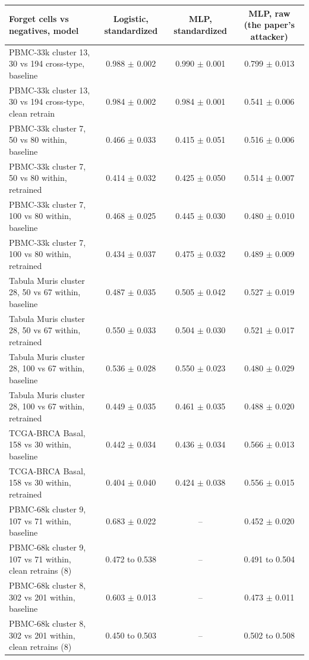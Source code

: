 \begin{tabular}{lccc}
\toprule
Forget cells vs negatives, model & Logistic, standardized & MLP, standardized & MLP, raw (the paper's attacker) \\
\midrule
PBMC-33k cluster 13, 30 vs 194 cross-type, baseline & 0.988 $\pm$ 0.002 & 0.990 $\pm$ 0.001 & 0.799 $\pm$ 0.013 \\
PBMC-33k cluster 13, 30 vs 194 cross-type, clean retrain & 0.984 $\pm$ 0.002 & 0.984 $\pm$ 0.001 & 0.541 $\pm$ 0.006 \\
PBMC-33k cluster 7, 50 vs 80 within, baseline & 0.466 $\pm$ 0.033 & 0.415 $\pm$ 0.051 & 0.516 $\pm$ 0.006 \\
PBMC-33k cluster 7, 50 vs 80 within, retrained & 0.414 $\pm$ 0.032 & 0.425 $\pm$ 0.050 & 0.514 $\pm$ 0.007 \\
PBMC-33k cluster 7, 100 vs 80 within, baseline & 0.468 $\pm$ 0.025 & 0.445 $\pm$ 0.030 & 0.480 $\pm$ 0.010 \\
PBMC-33k cluster 7, 100 vs 80 within, retrained & 0.434 $\pm$ 0.037 & 0.475 $\pm$ 0.032 & 0.489 $\pm$ 0.009 \\
Tabula Muris cluster 28, 50 vs 67 within, baseline & 0.487 $\pm$ 0.035 & 0.505 $\pm$ 0.042 & 0.527 $\pm$ 0.019 \\
Tabula Muris cluster 28, 50 vs 67 within, retrained & 0.550 $\pm$ 0.033 & 0.504 $\pm$ 0.030 & 0.521 $\pm$ 0.017 \\
Tabula Muris cluster 28, 100 vs 67 within, baseline & 0.536 $\pm$ 0.028 & 0.550 $\pm$ 0.023 & 0.480 $\pm$ 0.029 \\
Tabula Muris cluster 28, 100 vs 67 within, retrained & 0.449 $\pm$ 0.035 & 0.461 $\pm$ 0.035 & 0.488 $\pm$ 0.020 \\
TCGA-BRCA Basal, 158 vs 30 within, baseline & 0.442 $\pm$ 0.034 & 0.436 $\pm$ 0.034 & 0.566 $\pm$ 0.013 \\
TCGA-BRCA Basal, 158 vs 30 within, retrained & 0.404 $\pm$ 0.040 & 0.424 $\pm$ 0.038 & 0.556 $\pm$ 0.015 \\
PBMC-68k cluster 9, 107 vs 71 within, baseline & 0.683 $\pm$ 0.022 & -- & 0.452 $\pm$ 0.020 \\
PBMC-68k cluster 9, 107 vs 71 within, clean retrains (8) & 0.472 to 0.538 & -- & 0.491 to 0.504 \\
PBMC-68k cluster 8, 302 vs 201 within, baseline & 0.603 $\pm$ 0.013 & -- & 0.473 $\pm$ 0.011 \\
PBMC-68k cluster 8, 302 vs 201 within, clean retrains (8) & 0.450 to 0.503 & -- & 0.502 to 0.508 \\
\bottomrule
\end{tabular}

